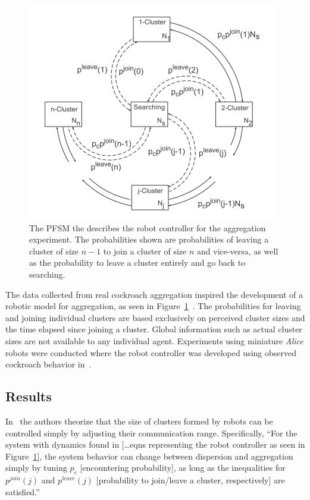 \documentclass[Main.tex]{subfiles}
\begin{document}
\begin{figure}[!htb]
\centering\includegraphics[width=.5\textwidth]{assets/aggfsm.png}
\caption{The PFSM the describes the robot controller for the aggregation experiment. The probabilities shown are probabilities of leaving a cluster of size $n-1$ to join a cluster of size $n$ and vice-versa, as well as the probability to leave a cluster entirely and go back to searching.}\label{fig:aggfsm}
\end{figure}

The data collected from real cockroach aggregation inspired the development of a robotic model for aggregation, as seen in Figure~\ref{fig:aggfsm}~\citep{Correll2007a}. The probabilities for leaving and joining individual clusters are based exclusively on perceived cluster sizes and the time elapsed since joining a cluster. Global information such as actual cluster sizes are not available to any individual agent. Experiments using miniature \emph{Alice} robots were conducted where the robot controller was developed using observed cockroach behavior in~\citep{Jeanson2005}.

\subsection*{Results}
In~\citep{Correll2011} the authors theorize that the size of clusters formed by robots can be controlled simply by adjusting their communication range. Specifically, ``For the system with dynamics found in [\ldots eqns representing the robot controller as seen in Figure~\ref{fig:aggfsm}], the system behavior can change between dispersion and aggregation simply by tuning $p_c$ [encountering probability], as long as the inequalities for $p^{join}(j)$ and $p^{leave}(j)$ [probability to join/leave a cluster, respectively] are satisfied.''
\end{document}
